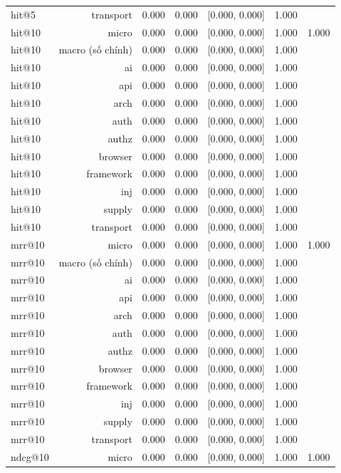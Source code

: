 \begin{table}[ht]
\begin{tabular}{lrrrrrr}
hit@5 & transport & 0.000 & 0.000 & [0.000, 0.000] & 1.000 &  \\
hit@10 & micro & 0.000 & 0.000 & [0.000, 0.000] & 1.000 & 1.000 \\
hit@10 & macro (số chính) & 0.000 & 0.000 & [0.000, 0.000] & 1.000 &  \\
hit@10 & ai & 0.000 & 0.000 & [0.000, 0.000] & 1.000 &  \\
hit@10 & api & 0.000 & 0.000 & [0.000, 0.000] & 1.000 &  \\
hit@10 & arch & 0.000 & 0.000 & [0.000, 0.000] & 1.000 &  \\
hit@10 & auth & 0.000 & 0.000 & [0.000, 0.000] & 1.000 &  \\
hit@10 & authz & 0.000 & 0.000 & [0.000, 0.000] & 1.000 &  \\
hit@10 & browser & 0.000 & 0.000 & [0.000, 0.000] & 1.000 &  \\
hit@10 & framework & 0.000 & 0.000 & [0.000, 0.000] & 1.000 &  \\
hit@10 & inj & 0.000 & 0.000 & [0.000, 0.000] & 1.000 &  \\
hit@10 & supply & 0.000 & 0.000 & [0.000, 0.000] & 1.000 &  \\
hit@10 & transport & 0.000 & 0.000 & [0.000, 0.000] & 1.000 &  \\
mrr@10 & micro & 0.000 & 0.000 & [0.000, 0.000] & 1.000 & 1.000 \\
mrr@10 & macro (số chính) & 0.000 & 0.000 & [0.000, 0.000] & 1.000 &  \\
mrr@10 & ai & 0.000 & 0.000 & [0.000, 0.000] & 1.000 &  \\
mrr@10 & api & 0.000 & 0.000 & [0.000, 0.000] & 1.000 &  \\
mrr@10 & arch & 0.000 & 0.000 & [0.000, 0.000] & 1.000 &  \\
mrr@10 & auth & 0.000 & 0.000 & [0.000, 0.000] & 1.000 &  \\
mrr@10 & authz & 0.000 & 0.000 & [0.000, 0.000] & 1.000 &  \\
mrr@10 & browser & 0.000 & 0.000 & [0.000, 0.000] & 1.000 &  \\
mrr@10 & framework & 0.000 & 0.000 & [0.000, 0.000] & 1.000 &  \\
mrr@10 & inj & 0.000 & 0.000 & [0.000, 0.000] & 1.000 &  \\
mrr@10 & supply & 0.000 & 0.000 & [0.000, 0.000] & 1.000 &  \\
mrr@10 & transport & 0.000 & 0.000 & [0.000, 0.000] & 1.000 &  \\
ndcg@10 & micro & 0.000 & 0.000 & [0.000, 0.000] & 1.000 & 1.000 \\

\end{tabular}
\end{table}
